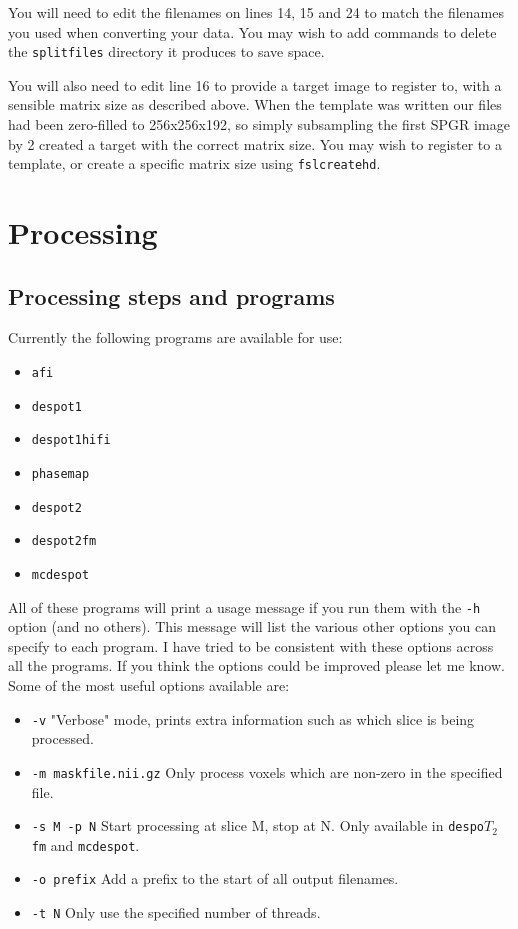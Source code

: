 \documentclass{report}
\begin{document}
You will need to edit the filenames on lines 14, 15 and 24 to match the filenames you used when converting your data. You may wish to add commands to delete the \texttt{splitfiles} directory it produces to save space.

You will also need to edit line 16 to provide a target image to register to, with  a sensible matrix size as described above. When the template was written our files had been zero-filled to 256x256x192, so simply subsampling the first SPGR image by 2 created a target with the correct matrix size. You may wish to register to a template, or create a specific matrix size using \texttt{fslcreatehd}.

\chapter{Processing}

\section{Processing steps and programs}

Currently the following programs are available for use:
\begin{itemize} \itemsep1pt \parskip0pt 
  \item \texttt{afi}
  \item \texttt{despot1}
  \item \texttt{despot1hifi}
  \item \texttt{phasemap}
  \item \texttt{despot2}
  \item \texttt{despot2fm}
  \item \texttt{mcdespot}
\end{itemize}

All of these programs will print a usage message if you run them with the \texttt{-h} option (and no others). This message will list the various other options you can specify to each program. I have tried to be consistent with these options across all the programs. If you think the options could be improved please let me know. Some of the most useful options available are:

\begin{itemize} \itemsep1pt \parskip0pt 
	\item \texttt{-v} "Verbose" mode, prints extra information such as which slice is being processed.
	\item \texttt{-m maskfile.nii.gz} Only process voxels which are non-zero in the specified file.
	\item \texttt{-s M -p N} Start processing at slice M, stop at N. Only available in \texttt{despo$T_2$fm} and \texttt{mcdespot}.
	\item \texttt{-o prefix} Add a prefix to the start of all output filenames.
	\item \texttt{-t N} Only use the specified number of threads.
\end{itemize}
\end{document}
